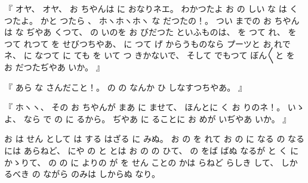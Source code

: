%
『
オヤ、
%
オヤ、
%
お
ちやんは
に
おなりネエ。
%
わかつたよ
お
の
しい
な
は
く
つたよ。
%
かと
つたら
、
%
%
ホヽホヽホヽ
な
だつたの！。
%
つい
までの
お
ちやんは
な
ぢやあ
くつて、
%
の
いのを
お
びだつた
といふものは、
を
つて
れ、
%
を
つて
れつて
を
せびつちやあ、
%
に
つて
げ
からうものなら
プーツと
お
れでネ、
%
に
なつて
に
ても
を
いて
つ
きかないで、
%
%
そして
でもつて
ぼん〳〵と
を
お
だつたぢやあ
いか。
』

%
『
あら
な
さんだこと！。
%
の
の
なんか
ひ
しなすつちやあ。
』

%
『
ホヽヽ、
%
その
お
ちやんが
まあ
に
ませて、
%
ほんとに
く
お
りのネ！。
%
いゝよ、
%
なら
で
の
に
るから。
%
ぢやあ
に
ることに
お
めが
いぢやあ
いか。
』

%
お
は
せん
として
は
する
はざる
に
みぬ。
%
お
の
を
れて
お
の
に
なる
の
なる
には
あらねど、
%
にや
の
と
とは
お
の
の
ひて、
%
の
をば
ばぬ
なるが
と
く
に
かゝりて、
%
の
の
に
よりの
が
を
せん
ことの
かは
らねど
らしき
して、
%
しかるべき
の
ながら
のみは
しからぬ
なり。
